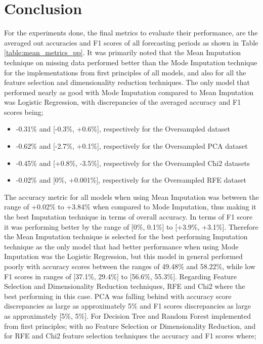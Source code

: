 \chapter{Conclusion}\label{chp:conclusion}
\noindent For the experiments done, the final metrics to evaluate their performance, are the averaged out accuracies and F1 scores of all forecasting periods as shown in Table \ref{table:mean_metrics_pp}. It was primarily noted that the Mean Imputation technique on missing data performed better than the Mode Imputation technique for the implementations from first principles of all models, and also for all the feature selection and dimensionality reduction techniques. The only model that performed nearly as good with Mode Imputation compared to Mean Imputation was Logistic Regression,
with discrepancies of the averaged accuracy and F1 scores being;
\begin{itemize}
\itemsep0em
    \item -0.31\% and [-0.3\%, +0.6\%], respectively for the Oversampled dataset
    \item -0.62\% and [-2.7\%, +0.1\%], respectively for the Oversampled PCA dataset
    \item -0.45\% and [+0.8\%, -3.5\%], respectively for the Oversampled Chi2 datasets
    \item -0.02\% and [0\%, +0.001\%], respectively for the Oversampled RFE dataset
\end{itemize}
The accuracy metric for all models when using Mean Imputation was between the range of +0.02\% to +3.84\% when compared to Mode Imputation, thus making it the best Imputation technique in terms of overall accuracy. In terms of F1 score it was performing better by the range of [0\%, 0.1\%] to [+3.9\%, +3.1\%]. Therefore the Mean Imputation technique is selected for the best performing Imputation technique as the only model that had better performance when using Mode Imputation was the Logistic Regression, but this model in general performed poorly with accuracy scores between the ranges of 49.48\% and 58.22\%, while low F1 scores in ranges of [37.1\%, 29.4\%] to [56.6\%, 55.3\%]. Regarding Feature Selection and Dimensionality Reduction techniques, RFE and Chi2 where the best performing in this case. PCA was falling behind with accuracy score discrepancies as large as approximately 5\% and F1 scores discrepancies as large as approximately [5\%, 5\%]. For Decision Tree and Random Forest implemented from first principles; with no Feature Selection or Dimensionality Reduction, and for RFE and Chi2 feature selection techniques the accuracy and F1 scores where;
